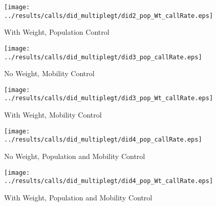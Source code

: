 \documentclass[11pt,letterpaper]{article}
\begin{document}
\begin{figure}[H]
\caption{With Weight, Population Control}
\centering
\texttt{[image: ../results/calls/did\_multiplegt/did2\_pop\_Wt\_callRate.eps]}
\end{figure}
\begin{figure}[H]
\caption{No Weight, Mobility Control}
\centering
\texttt{[image: ../results/calls/did\_multiplegt/did3\_pop\_callRate.eps]}
\end{figure}

\begin{figure}[H]
\caption{With Weight, Mobility Control}
\centering
\texttt{[image: ../results/calls/did\_multiplegt/did3\_pop\_Wt\_callRate.eps]}
\end{figure}
\begin{figure}[H]
\caption{No Weight, Population and Mobility Control}
\centering
\texttt{[image: ../results/calls/did\_multiplegt/did4\_pop\_callRate.eps]}
\end{figure}

\begin{figure}[H]
\caption{With Weight, Population and Mobility Control}
\centering
\texttt{[image: ../results/calls/did\_multiplegt/did4\_pop\_Wt\_callRate.eps]}
\end{figure}
\end{document}
